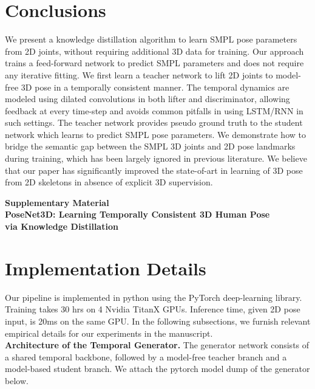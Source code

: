 \documentclass[10pt,twocolumn,letterpaper]{article}
\begin{document}
 


\section{Conclusions}
\label{section:conclusion}
We present a knowledge distillation algorithm to learn SMPL pose parameters from 2D joints, without requiring additional 3D data for training. Our approach trains a feed-forward network to predict SMPL parameters and does not require any iterative fitting. We first learn a teacher network to lift 2D joints to model-free 3D pose in a temporally consistent manner. The temporal dynamics are modeled using dilated convolutions in both lifter and discriminator, allowing feedback at every time-step and avoids common pitfalls in using LSTM/RNN in such settings. The teacher network provides pseudo ground truth to the student network which learns to predict SMPL pose parameters. We demonstrate how to bridge the semantic gap between the SMPL 3D joints and 2D pose landmarks during training, which has been largely ignored in previous literature. We believe that our paper has significantly improved the state-of-art in learning of 3D pose from 2D skeletons in absence of explicit 3D supervision.
 
\clearpage

{\small


}
\vspace{115ex}
\begin{figure*}[!htb]
	\centering
	\textbf{\large Supplementary Material\\PoseNet3D: Learning Temporally Consistent 3D Human Pose\\ via Knowledge Distillation}
\end{figure*}
\pagebreak

\appendix

\section{Implementation Details}

Our pipeline is implemented in python using the PyTorch deep-learning library. Training takes 30 hrs on 4 Nvidia TitanX GPUs. Inference time, given 2D pose input, is 20ms on the same GPU. In the following subsections, we furnish relevant empirical details for our experiments in the manuscript. \\

\noindent \textbf{Architecture of the Temporal Generator.}
The generator network consists of a shared temporal backbone, followed by a model-free teacher branch and a model-based student branch. We attach the pytorch model dump of the generator below.  
\end{document}
